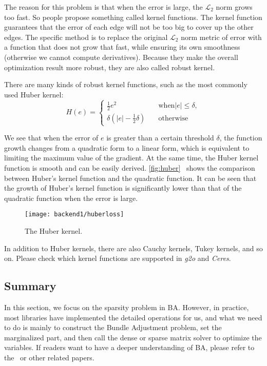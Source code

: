 The reason for this problem is that when the error is large, the $\mathcal{L}_2$ norm grows too fast. So people propose something called kernel functions. The kernel function guarantees that the error of each edge will not be too big to cover up the other edges. The specific method is to replace the original  $\mathcal{L}_2$ norm metric of error with a function that does not grow that fast, while ensuring its own smoothness (otherwise we cannot compute derivatives). Because they make the overall optimization result more robust, they are also called robust kernel.

There are many kinds of robust kernel functions, such as the most commonly used Huber kernel:
\begin{equation}
	H\left( e \right) = 
	\left\{ 
	\begin{array}{ll}
		\frac{1}{2}{e^2} &\quad \text{when} |e| \leqslant \delta, \\
		\delta \left( {\left| e \right| - \frac{1}{2}\delta } \right) &\quad \text{otherwise}
	\end{array} \right.
\end{equation}

We see that when the error of $e$ is greater than a certain threshold $\delta$, the function growth changes from a quadratic form to a linear form, which is equivalent to limiting the maximum value of the gradient. At the same time, the Huber kernel function is smooth and can be easily derived. \autoref{fig:huber}~ shows the comparison between Huber's kernel function and the quadratic function. It can be seen that the growth of Huber's kernel function is significantly lower than that of the quadratic function when the error is large.

\begin{figure}[!htp]
	\centering
	\texttt{[image: backend1/huberloss]}
	\caption{The Huber kernel.}
	\label{fig:huber}
\end{figure}

In addition to Huber kernels, there are also Cauchy kernels, Tukey kernels, and so on. Please check which kernel functions are supported in \textit{g2o} and \textit{Ceres}.

\subsection{Summary}
In this section, we focus on the sparsity problem in BA. However, in practice, most libraries have implemented the detailed operations for us, and what we need to do is mainly to construct the Bundle Adjustment problem, set the marginalized part, and then call the dense or sparse matrix solver to optimize the variables. If readers want to have a deeper understanding of BA, please refer to the~\cite{Triggs2000} or other related papers.

